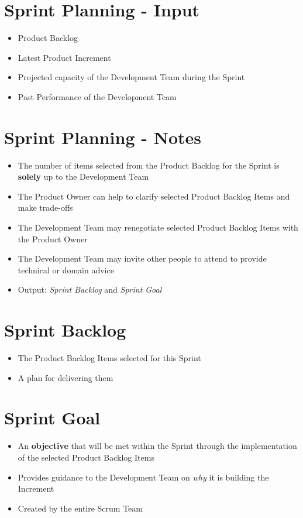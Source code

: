 \documentclass[a4paper,11pt,twocolumn]{article}
\begin{document}
\section*{Sprint Planning - Input}
\begin{itemize}
    \item Product Backlog
    \item Latest Product Increment
    \item Projected capacity of the Development Team during the Sprint
    \item Past Performance of the Development Team
\end{itemize}

\section*{Sprint Planning - Notes}
\begin{itemize}
    \item The number of items selected from the Product Backlog for the Sprint is \textbf{solely} up to the Development Team
	\item The Product Owner can help to clarify selected Product Backlog Items and make trade-offs
	\item The Development Team may renegotiate selected Product Backlog Items with the Product Owner
	\item The Development Team may invite other people to attend to provide technical or domain advice
	\item Output: \textit{Sprint Backlog} and \textit{Sprint Goal}
\end{itemize}

\section*{Sprint Backlog}
\begin{itemize}
    \item The Product Backlog Items selected for this Sprint
    \item A plan for delivering them
\end{itemize}

\section*{Sprint Goal}
\begin{itemize}
    \item An \textbf{objective} that will be met within the Sprint through the implementation of the selected Product Backlog Items
    \item Provides guidance to the Development Team on \textit{why} it is building the Increment
    \item Created by the entire Scrum Team
\end{itemize}
\end{document}
